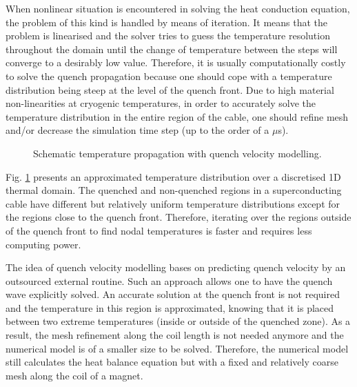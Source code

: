 
When nonlinear situation is encountered in solving the heat conduction equation, the problem of this kind is handled by means of iteration. It means that the problem is linearised and the solver tries to guess the temperature resolution throughout the domain until the change of temperature between the steps will converge to a desirably low value. Therefore, it is usually computationally costly to solve the quench propagation because one should cope with a temperature distribution being steep at the level of the quench front. Due to high material non-linearities at cryogenic temperatures, in order to accurately solve the temperature distribution in the entire region of the cable, one should refine mesh and/or decrease the simulation time step (up to the order of a $\mu$s).

\begin{figure}[H]
\centering
{}
\caption{Schematic temperature propagation with quench velocity modelling.}
\label{fig:modelling_approach}
\end{figure}

Fig. \ref{fig:modelling_approach} presents an approximated temperature distribution over a discretised 1D thermal domain. The quenched and non-quenched regions in a superconducting cable have different but relatively uniform temperature distributions except for the regions close to the quench front. Therefore, iterating over the regions outside of the quench front to find nodal temperatures is faster and requires less computing power.

The idea of quench velocity modelling bases on predicting quench velocity by an outsourced external routine. Such an approach allows one to have the quench wave explicitly solved. An accurate solution at the quench front is not required and the temperature in this region is approximated, knowing that it is placed between two extreme temperatures (inside or outside of the quenched zone). As a result, the mesh refinement along the coil length is not needed anymore and the numerical model is of a smaller size to be solved. Therefore, the numerical model still calculates the heat balance equation but with a fixed and relatively coarse mesh along the coil of a magnet. 

